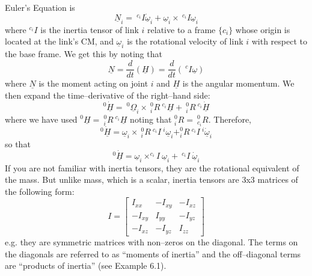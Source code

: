 \documentclass[fleqn]{article}
\begin{document}
Euler's Equation is
\begin{displaymath}
	\underline{N}_{i} =\  ^{c_{i}}\!I\underline{\dot{\omega}}_{i} + \underline{\omega}_{i} \times \ \!^{c_{i}}\!I\underline{\omega}_{i}
\end{displaymath}
where $^{c_{i}}\!I$ is the inertia tensor of link $i$ relative to a frame $\{c_{i}\}$ whose origin is located at the link's CM, and $\underline{\omega}_{i}$ is the rotational velocity of link $i$ with respect to the base frame. We get this by noting that
\begin{displaymath}
	\underline{N} = \frac{d}{dt}(\underline{H}) = \frac{d}{dt} \left(\ ^{c}I\underline{\omega}\right)
\end{displaymath}
where $\underline{N}$ is the moment acting on joint $i$ and $\underline{H}$ is the angular momentum. We then expand the time--derivative of the right--hand side:
\begin{displaymath}
^{0}\underline{\dot{H}} = \ ^{0}\underline{\Omega}_{i} \times\ ^{0}_{i}R\ ^{c_{i}}\!\underline{H} + \ ^{0}_{i}R\ ^{c_{i}}\!\underline{\dot{H}}
\end{displaymath}
where we have used $^{0}\underline{H} = \ ^{0}_{i}R\ ^{c_{i}}\!\underline{H}$ noting that $^{0}_{i}R = \ ^{0}_{c_{i}}\!R$. Therefore,
\begin{displaymath}
^{0}\underline{\dot{H}} = \underline{\omega}_{i} \times\ ^{0}_{i}R\ ^{c_{i}}\!I\ ^{i}\underline{\omega}_{i} + ^{0}_{i}R\ ^{c_{i}}\!I\ ^{i}\underline{\dot{\omega}}_{i}
\end{displaymath}
so that
\begin{displaymath}
^{0}\underline{\dot{H}} = \underline{\omega}_{i} \times ^{c_{i}}\!\!I\ \underline{\omega}_{i} + \ ^{c_{i}}\!I\ \underline{\dot{\omega}}_{i}
\end{displaymath}
If you are not familiar with inertia tensors, they are the rotational equivalent of the mass. But unlike mass, which is a scalar, inertia tensors are 3x3 matrices of the following form:
\begin{displaymath}
	I = \left[ \begin{array}{ccc}
		I_{xx} & -I_{xy} & -I_{xz} \\
		-I_{xy} & I_{yy} & -I_{yz} \\
		-I_{xz} & -I_{yz} & I_{zz} \end{array} \right]
\end{displaymath}
e.g. they are symmetric matrices with non--zeros on the diagonal. The terms on the diagonals are referred to as ``moments of inertia'' and the off--diagonal terms are ``products of inertia'' (see Example 6.1).
\end{document}
